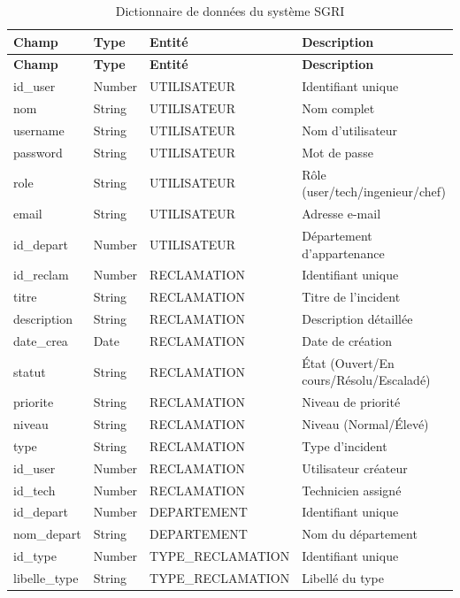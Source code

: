 \documentclass[12pt,a4paper,oneside]{report}
\begin{document}
\begin{longtable}{p{3cm} p{1.8cm} p{3.2cm} p{5.5cm}}
    \caption{Dictionnaire de données du système SGRI}
    \label{tab:dictionary} \\
    \toprule
    \textbf{Champ} & \textbf{Type} & \textbf{Entité} & \textbf{Description} \\
    \midrule
    \endfirsthead
    \toprule
    \textbf{Champ} & \textbf{Type} & \textbf{Entité} & \textbf{Description} \\
    \midrule
    \endhead
    \bottomrule
    \endfoot
    
    id\_user      & Number   & UTILISATEUR    & Identifiant unique \\
    nom           & String   & UTILISATEUR    & Nom complet \\
    username      & String   & UTILISATEUR    & Nom d'utilisateur \\
    password      & String   & UTILISATEUR    & Mot de passe \\
    role          & String   & UTILISATEUR    & Rôle (user/tech/ingenieur/chef) \\
    email         & String   & UTILISATEUR    & Adresse e-mail \\
    id\_depart    & Number   & UTILISATEUR    & Département d'appartenance \\
    id\_reclam    & Number   & RECLAMATION    & Identifiant unique \\
    titre         & String   & RECLAMATION    & Titre de l'incident \\
    description   & String   & RECLAMATION    & Description détaillée \\
    date\_crea    & Date     & RECLAMATION    & Date de création \\
    statut        & String   & RECLAMATION    & État (Ouvert/En cours/Résolu/Escaladé) \\
    priorite      & String   & RECLAMATION    & Niveau de priorité \\
    niveau        & String   & RECLAMATION    & Niveau (Normal/Élevé) \\
    type          & String   & RECLAMATION    & Type d'incident \\
    id\_user      & Number   & RECLAMATION    & Utilisateur créateur \\
    id\_tech      & Number   & RECLAMATION    & Technicien assigné \\
    id\_depart    & Number   & DEPARTEMENT    & Identifiant unique \\
    nom\_depart   & String   & DEPARTEMENT    & Nom du département \\
    id\_type      & Number   & TYPE\_RECLAMATION & Identifiant unique \\
    libelle\_type & String   & TYPE\_RECLAMATION & Libellé du type \\
\end{longtable}
\end{document}
